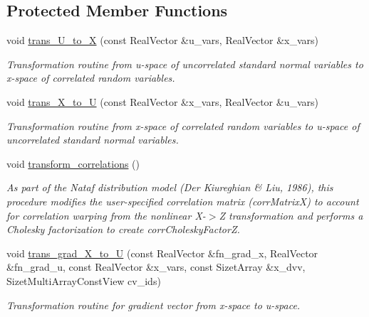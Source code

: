 \subsection*{Protected Member Functions}
\begin{DoxyCompactItemize}
\item 
void \hyperlink{classPecos_1_1NatafTransformation_a0a84860a9ed0cec52ed100edb49f209c}{trans\+\_\+\+U\+\_\+to\+\_\+X} (const Real\+Vector \&u\+\_\+vars, Real\+Vector \&x\+\_\+vars)
\begin{DoxyCompactList}\small\item\em Transformation routine from u-\/space of uncorrelated standard normal variables to x-\/space of correlated random variables. \end{DoxyCompactList}\item 
void \hyperlink{classPecos_1_1NatafTransformation_a22c3e4ffde57732ffe3cbb7ab5fce86b}{trans\+\_\+\+X\+\_\+to\+\_\+U} (const Real\+Vector \&x\+\_\+vars, Real\+Vector \&u\+\_\+vars)
\begin{DoxyCompactList}\small\item\em Transformation routine from x-\/space of correlated random variables to u-\/space of uncorrelated standard normal variables. \end{DoxyCompactList}\item 
void \hyperlink{classPecos_1_1NatafTransformation_a1be77b7133acb8e63d2c6957b9eb6265}{transform\+\_\+correlations} ()
\begin{DoxyCompactList}\small\item\em As part of the Nataf distribution model (Der Kiureghian \& Liu, 1986), this procedure modifies the user-\/specified correlation matrix (corr\+MatrixX) to account for correlation warping from the nonlinear X-\/$>$Z transformation and performs a Cholesky factorization to create corr\+Cholesky\+FactorZ. \end{DoxyCompactList}\item 
void \hyperlink{classPecos_1_1NatafTransformation_ae96fa589437ca113086aa590ac2e0901}{trans\+\_\+grad\+\_\+\+X\+\_\+to\+\_\+U} (const Real\+Vector \&fn\+\_\+grad\+\_\+x, Real\+Vector \&fn\+\_\+grad\+\_\+u, const Real\+Vector \&x\+\_\+vars, const Sizet\+Array \&x\+\_\+dvv, Sizet\+Multi\+Array\+Const\+View cv\+\_\+ids)
\begin{DoxyCompactList}\small\item\em Transformation routine for gradient vector from x-\/space to u-\/space. \end{DoxyCompactList}\item 

\end{DoxyCompactItemize}

